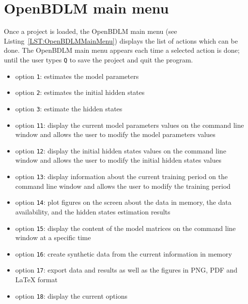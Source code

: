 \section{OpenBDLM main menu}
\label{S:OPENBDLMMAINMENU}

Once a project is loaded, the OpenBDLM main menu (see Listing~\ref{LST:OpenBDLMMainMenu}) displays the list of actions which can be done. 
The OpenBDLM main menu appears each time a selected action is done; until the user types \colorbox{light-gray}{\lstinline[basicstyle = \mlttfamily \small ]!Q!} to save the project and quit the program.

\begin{itemize}
    \item option  \colorbox{light-gray}{\lstinline[basicstyle = \mlttfamily \small ]!1!}: estimates the model parameters
    \item option  \colorbox{light-gray}{\lstinline[basicstyle = \mlttfamily \small ]!2!}: estimates the initial hidden states
    \item option  \colorbox{light-gray}{\lstinline[basicstyle = \mlttfamily \small ]!3!}: estimate the hidden states
    \item option  \colorbox{light-gray}{\lstinline[basicstyle = \mlttfamily \small ]!11!}: display the current model parameters values on the \MATLAB{} command line window and allows the user to modify the model parameters values
     \item option  \colorbox{light-gray}{\lstinline[basicstyle = \mlttfamily \small ]!12!}: display the initial hidden states values on the \MATLAB{} command line window and allows the user to modify the initial hidden states values
     \item option  \colorbox{light-gray}{\lstinline[basicstyle = \mlttfamily \small ]!13!}: display information about the current training period  on the \MATLAB{} command line window and allows the user to modify the training period
     \item option  \colorbox{light-gray}{\lstinline[basicstyle = \mlttfamily \small ]!14!}: plot figures on the screen about the data in memory, the data availability, and the hidden states estimation results
     \item option  \colorbox{light-gray}{\lstinline[basicstyle = \mlttfamily \small ]!15!}: display the content of the model matrices on the \MATLAB{} command line window at a specific time
     \item option  \colorbox{light-gray}{\lstinline[basicstyle = \mlttfamily \small ]!16!}: create synthetic data from the current information in memory
     \item option  \colorbox{light-gray}{\lstinline[basicstyle = \mlttfamily \small ]!17!}: export data and results as well as the figures in PNG, PDF and  \LaTeX{}   format
     \item option  \colorbox{light-gray}{\lstinline[basicstyle = \mlttfamily \small ]!18!}: display the current options 
    \end{itemize}

